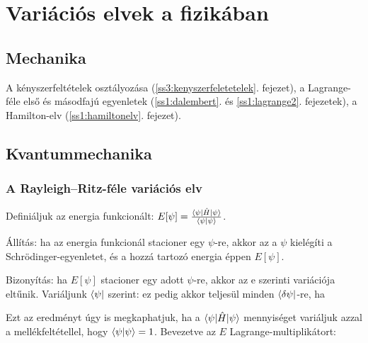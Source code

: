 \chapter{Vari\'aci\'os elvek a fizik\'aban}
 
 \section{Mechanika}
  
  A kényszerfeltételek osztályozása (\ref{ss3:kenyszerfeletetelek}. fejezet), a Lagrange-féle első és másodfajú egyenletek (\ref{ss1:dalembert}. és \ref{ss1:lagrange2}. fejezetek), a Hamilton-elv (\ref{ss1:hamiltonelv}. fejezet).
  
 \section{Kvantummechanika}
  
  \subsection{A Rayleigh--Ritz-féle variációs elv}
   
   Definiáljuk az energia funkcionált: $E[\psi]=\frac{\langle\psi\rvert\hat{H}\lvert\psi\rangle}{\langle\psi\rvert\psi\rangle}$. 
   
   Állítás: ha az energia funkcionál stacioner egy $\psi$-re, akkor az a $\psi$ kielégíti a Schrödinger-egyenletet, és a hozzá tartozó energia éppen $E[\psi]$. 
   
   Bizonyítás: ha $E[\psi]$ stacioner egy adott $\psi$-re, akkor az e szerinti variációja eltűnik. Variáljunk $\langle\psi\rvert$ szerint:
   ez pedig akkor teljesül minden $\langle\delta\psi\rvert$-re, ha 
   
   Ezt az eredményt úgy is megkaphatjuk, ha a $\langle\psi\rvert\hat{H}\lvert\psi\rangle$ mennyiséget variáljuk azzal a mellékfeltétellel, hogy $\langle\psi\rvert\psi\rangle=1$. Bevezetve az $E$ Lagrange-multiplikátort:
   
